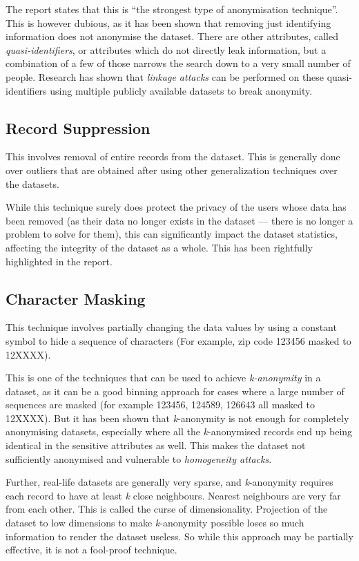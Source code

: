 \documentclass[11pt, a4paper]{article}
\begin{document}
The report states that this is ``the strongest type of anonymisation technique''. This is however dubious, as it has been shown that removing just identifying information does not anonymise the dataset. There are other attributes, called \textit{quasi-identifiers}\cite{termsuppression}, or attributes which do not directly leak information, but a combination of a few of those narrows the search down to a very small number of people. Research \cite{suppression} has shown that \textit{linkage attacks} can be performed on these quasi-identifiers using multiple publicly available datasets to break anonymity.

\subsection{Record Suppression}

This involves removal of entire records from the dataset. This is generally done over outliers that are obtained after using other generalization techniques over the datasets.

While this technique surely does protect the privacy of the users whose data has been removed (as their data no longer exists in the dataset --- there is no longer a problem to solve for them), this can significantly impact the dataset statistics, affecting the integrity of the dataset as a whole. This has been rightfully highlighted in the report.

\subsection{Character Masking}

This technique involves partially changing the data values by using a constant symbol to hide a sequence of characters (For example, zip code 123456 masked to 12XXXX). 

This is one of the techniques that can be used to achieve \textit{k-anonymity}\cite{k-anon, k-anonprocess} in a dataset, as it can be a good binning approach for cases where a large number of sequences are masked (for example 123456, 124589, 126643 all masked to 12XXXX). But it has been shown that \textit{k}-anonymity is not enough for completely anonymising datasets, especially where all the \textit{k}-anonymised records end up being identical in the sensitive attributes as well. This makes the dataset not sufficiently anonymised and vulnerable to \textit{homogeneity attacks}\cite{l-diversity}. 

Further, real-life datasets are generally very sparse, and \textit{k}-anonymity requires each record to have at least \textit{k} close neighbours. Nearest neighbours are very far from each other. This is called the curse of dimensionality\cite{k-anoncod}. Projection of the dataset to low dimensions to make \textit{k}-anonymity possible loses so much information to render the dataset useless. So while this approach may be partially effective, it is not a fool-proof technique.
\end{document}

